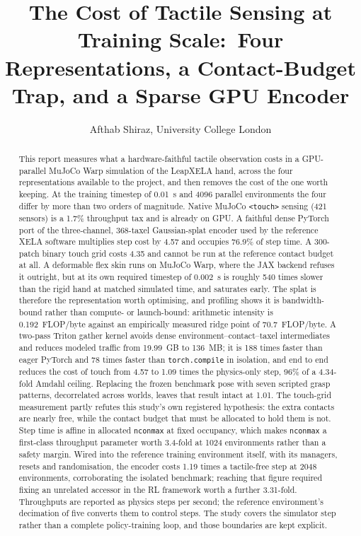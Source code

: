\documentclass[journal]{IEEEtran}
\begin{document}
\title{The Cost of Tactile Sensing at Training Scale:\ Four Representations, a Contact-Budget Trap, and a Sparse GPU Encoder}

\author{Afthab Shiraz, University College London}

\maketitle

\begin{abstract}
This report measures what a hardware-faithful tactile observation costs in a GPU-parallel MuJoCo Warp simulation of the LeapXELA hand, across the four representations available to the project, and then removes the cost of the one worth keeping. At the training timestep of 0.01~s and 4096 parallel environments the four differ by more than two orders of magnitude. Native MuJoCo \texttt{\textless touch\textgreater} sensing (421 sensors) is a 1.7\% throughput tax and is already on GPU. A faithful dense PyTorch port of the three-channel, 368-taxel Gaussian-splat encoder used by the reference XELA software multiplies step cost by 4.57 and occupies 76.9\% of step time. A 300-patch binary touch grid costs 4.35 and cannot be run at the reference contact budget at all. A deformable flex skin runs on MuJoCo Warp, where the JAX backend refuses it outright, but at its own required timestep of 0.002~s is roughly 540 times slower than the rigid hand at matched simulated time, and saturates early. The splat is therefore the representation worth optimising, and profiling shows it is bandwidth-bound rather than compute- or launch-bound: arithmetic intensity is 0.192~FLOP/byte against an empirically measured ridge point of 70.7~FLOP/byte. A two-pass Triton gather kernel avoids dense environment--contact--taxel intermediates and reduces modeled traffic from 19.99~GB to 136~MB; it is 188 times faster than eager PyTorch and 78 times faster than \texttt{torch.compile} in isolation, and end to end reduces the cost of touch from 4.57 to 1.09 times the physics-only step, 96\% of a 4.34-fold Amdahl ceiling. Replacing the frozen benchmark pose with seven scripted grasp patterns, decorrelated across worlds, leaves that result intact at 1.01. The touch-grid measurement partly refutes this study's own registered hypothesis: the extra contacts are nearly free, while the contact budget that must be allocated to hold them is not. Step time is affine in allocated \texttt{nconmax} at fixed occupancy, which makes \texttt{nconmax} a first-class throughput parameter worth 3.4-fold at 1024 environments rather than a safety margin. Wired into the reference training environment itself, with its managers, resets and randomisation, the encoder costs 1.19 times a tactile-free step at 2048 environments, corroborating the isolated benchmark; reaching that figure required fixing an unrelated accessor in the RL framework worth a further 3.31-fold. Throughputs are reported as physics steps per second; the reference environment's decimation of five converts them to control steps. The study covers the simulator step rather than a complete policy-training loop, and those boundaries are kept explicit.
\end{abstract}
\end{document}
